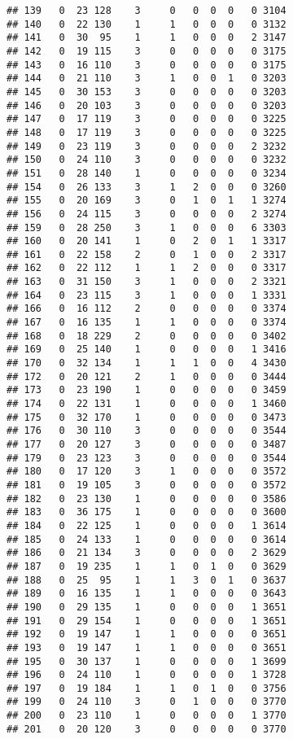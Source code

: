 \documentclass[]{book}
\begin{document}
\begin{verbatim}
## 139   0  23 128    3     0   0  0  0   0 3104
## 140   0  22 130    1     1   0  0  0   0 3132
## 141   0  30  95    1     1   0  0  0   2 3147
## 142   0  19 115    3     0   0  0  0   0 3175
## 143   0  16 110    3     0   0  0  0   0 3175
## 144   0  21 110    3     1   0  0  1   0 3203
## 145   0  30 153    3     0   0  0  0   0 3203
## 146   0  20 103    3     0   0  0  0   0 3203
## 147   0  17 119    3     0   0  0  0   0 3225
## 148   0  17 119    3     0   0  0  0   0 3225
## 149   0  23 119    3     0   0  0  0   2 3232
## 150   0  24 110    3     0   0  0  0   0 3232
## 151   0  28 140    1     0   0  0  0   0 3234
## 154   0  26 133    3     1   2  0  0   0 3260
## 155   0  20 169    3     0   1  0  1   1 3274
## 156   0  24 115    3     0   0  0  0   2 3274
## 159   0  28 250    3     1   0  0  0   6 3303
## 160   0  20 141    1     0   2  0  1   1 3317
## 161   0  22 158    2     0   1  0  0   2 3317
## 162   0  22 112    1     1   2  0  0   0 3317
## 163   0  31 150    3     1   0  0  0   2 3321
## 164   0  23 115    3     1   0  0  0   1 3331
## 166   0  16 112    2     0   0  0  0   0 3374
## 167   0  16 135    1     1   0  0  0   0 3374
## 168   0  18 229    2     0   0  0  0   0 3402
## 169   0  25 140    1     0   0  0  0   1 3416
## 170   0  32 134    1     1   1  0  0   4 3430
## 172   0  20 121    2     1   0  0  0   0 3444
## 173   0  23 190    1     0   0  0  0   0 3459
## 174   0  22 131    1     0   0  0  0   1 3460
## 175   0  32 170    1     0   0  0  0   0 3473
## 176   0  30 110    3     0   0  0  0   0 3544
## 177   0  20 127    3     0   0  0  0   0 3487
## 179   0  23 123    3     0   0  0  0   0 3544
## 180   0  17 120    3     1   0  0  0   0 3572
## 181   0  19 105    3     0   0  0  0   0 3572
## 182   0  23 130    1     0   0  0  0   0 3586
## 183   0  36 175    1     0   0  0  0   0 3600
## 184   0  22 125    1     0   0  0  0   1 3614
## 185   0  24 133    1     0   0  0  0   0 3614
## 186   0  21 134    3     0   0  0  0   2 3629
## 187   0  19 235    1     1   0  1  0   0 3629
## 188   0  25  95    1     1   3  0  1   0 3637
## 189   0  16 135    1     1   0  0  0   0 3643
## 190   0  29 135    1     0   0  0  0   1 3651
## 191   0  29 154    1     0   0  0  0   1 3651
## 192   0  19 147    1     1   0  0  0   0 3651
## 193   0  19 147    1     1   0  0  0   0 3651
## 195   0  30 137    1     0   0  0  0   1 3699
## 196   0  24 110    1     0   0  0  0   1 3728
## 197   0  19 184    1     1   0  1  0   0 3756
## 199   0  24 110    3     0   1  0  0   0 3770
## 200   0  23 110    1     0   0  0  0   1 3770
## 201   0  20 120    3     0   0  0  0   0 3770

\end{verbatim}
\end{document}
